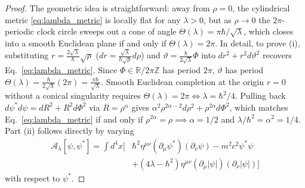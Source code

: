\documentclass[11pt, a4paper]{article}
\theoremstyle{definition}
\begin{document}
\begin{proof}
The geometric idea is straightforward: away from $\rho = 0$, the cylindrical metric \eqref{eq:lambda_metric} is locally flat for any $\lambda > 0$, but as $\rho \to 0$ the $2\pi$-periodic clock circle sweeps out a cone of angle $\Theta(\lambda) = \pi\hbar/\sqrt{\lambda}$, which closes into a smooth Euclidean plane if and only if $\Theta(\lambda) = 2\pi$. In detail, to prove (i), substituting $r = \frac{2\sqrt{\lambda}}{\hbar}\sqrt{\rho}$ ($dr = \frac{\sqrt{\lambda}}{\hbar\sqrt{\rho}}d\rho$) and $\vartheta = \frac{\hbar}{2\sqrt{\lambda}}\Phi$ into $dr^2 + r^2 d\vartheta^2$ recovers Eq.~\eqref{eq:lambda_metric}. Since $\Phi \in \mathbb{R}/2\pi\mathbb{Z}$ has period $2\pi$, $\vartheta$ has period $\Theta(\lambda) = \frac{\hbar}{2\sqrt{\lambda}}(2\pi) = \frac{\pi\hbar}{\sqrt{\lambda}}$. Smooth Euclidean completion at the origin $r = 0$ without a conical singularity requires $\Theta(\lambda) = 2\pi \iff \lambda = \hbar^2/4$. Pulling back $d\psi^* d\psi = dR^2 + R^2 d\Phi^2$ via $R = \rho^\alpha$ gives $\alpha^2 \rho^{2\alpha-2}d\rho^2 + \rho^{2\alpha}d\Phi^2$, which matches Eq.~\eqref{eq:lambda_metric} if and only if $\rho^{2\alpha} = \rho \implies \alpha = 1/2$ and $\lambda/\hbar^2 = \alpha^2 = 1/4$. Part (ii) follows directly by varying
\begin{equation}
\begin{aligned}
\mathcal{A}_\lambda[\psi, \psi^*] = \int d^4x \Big[ &\hbar^2\eta^{\mu\nu}(\partial_\mu\psi^*)(\partial_\nu\psi) - m^2 c^2 \psi^*\psi \\
&+ (4\lambda - \hbar^2)\eta^{\mu\nu}(\partial_\mu|\psi|)(\partial_\nu|\psi|) \Big]
\end{aligned}
\end{equation}
with respect to $\psi^*$.
\end{proof}
\end{document}
